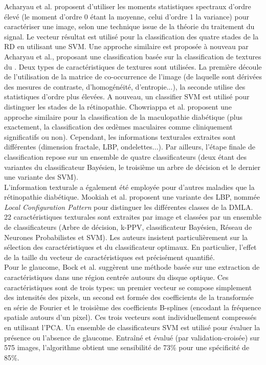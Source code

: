 Acharyau et al.\cite{acharyauApplicationHigherOrder2008} proposent d'utiliser les moments statistiques spectraux d'ordre élevé (le moment d'ordre 0 étant la moyenne, celui d'ordre 1 la variance) pour caractériser une image, selon une technique issue de la théorie du traitement du signal.  Le vecteur résultat est utilisé pour la classification des quatre stades de la \ac{RD} en utilisant une \ac{SVM}. Une approche similaire est proposée à nouveau par Acharyau et al.\cite{acharyaIntegratedIndexIdentification2012}, proposant une classification basée sur la classification de textures du \fundus{}. Deux types de caractéristiques de textures sont utilisées. La première découle de l'utilisation de la matrice de co-occurrence de l'image (de laquelle sont dérivées des mesures de contraste, d'homogénéité, d'entropie...), la seconde utilise des statistiques d'ordre plus élevées. A nouveau, un classifier \ac{SVM} est utilisé pour distinguer les stades de la rétinopathie. Chowriappa et al.\cite{chowriappaEnsembleSelectionFeaturebased2013} proposent une approche similaire pour la classification de la maculopathie diabétique (plus exactement, la classification des \oe{}dèmes maculaires comme cliniquement significatifs ou non). Cependant, les informations texturales extraites sont différentes (dimension fractale, \ac{LBP}, ondelettes...). Par ailleurs, l'étape finale de classification repose sur un ensemble de quatre classificateurs (deux étant des variantes du classificateur Bayésien, le troisième un arbre de décision et le dernier une variante des \ac{SVM}).
\\ L'information texturale a également été employée pour d'autres maladies que la rétinopathie diabétique. Mookiah et al.\cite{mookiahLocalConfigurationPattern2015} proposent une variante des \ac{LBP}, nommée \textit{Local Configuration Pattern} pour distinguer les différentes classes de la \ac{DMLA}. 22 caractéristiques texturales sont extraites par image et classées par un ensemble de classificateurs (Arbre de décision, \ac{k-PPV}, classificateur Bayésien, Réseau de Neurones Probabilistes et \ac{SVM}). Les auteurs insistent particulièrement sur la sélection des caractéristiques et du classificateur optimaux. En particulier, l'effet de la taille du vecteur de caractéristiques est précisément quantifié.
\\
Pour le glaucome, Bock et al.\cite{bockGlaucomaRiskIndex2010} suggèrent une méthode basée sur une extraction de caractéristiques dans une région centrée autours du disque optique. Ces caractéristiques sont de trois types: un premier vecteur se compose simplement des intensités des pixels, un second est formée des coefficients de la transformée en série de Fourier et le troisième des coefficients B-splines (encodant la fréquence spatiale autours d'un pixel). Ces trois vecteurs sont individuellement compressés en utilisant l'\ac{PCA}. Un ensemble de classificateurs \ac{SVM} est utilisé pour évaluer la présence ou l'absence de glaucome. Entraîné et évalué (par validation-croisée) sur 575 images, l'algorithme obtient une sensibilité de 73\% pour une spécificité de 85\%. 
\bigbreak

